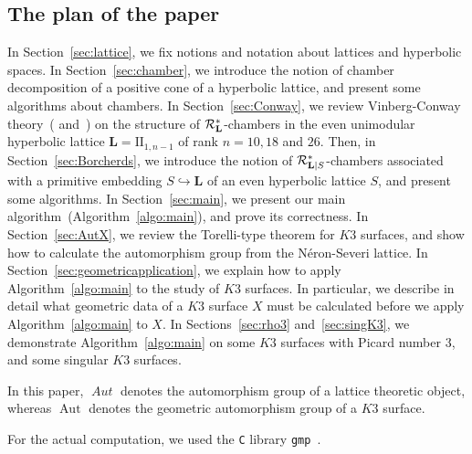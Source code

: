 \documentclass{amsart}
\theoremstyle{plain}
\theoremstyle{definition}
\theoremstyle{remark}
\numberwithin{equation}{section}
\numberwithin{table}{section}
\numberwithin{figure}{section}
\newcommand{\RRR}{\mathord{\mathcal R}}
\newcommand{\inj}{\hookrightarrow}
\newcommand{\Aut}{\operatorname{\mathrm {Aut}}\nolimits}
\renewcommand{\L}{\mathord{\mathbf{L}}}
\newcommand{\aut}{\operatorname{\mathit {Aut}}\nolimits}
\newcommand{\Roots}{\RRR}
\newcommand{\sphyp}{\sp*}
\newcommand{\RtsLS}{\Roots_{\L|S}}
\begin{document}
\subsection{The plan of the paper}
%
In Section~\ref{sec:lattice},
we fix notions and notation about lattices
and hyperbolic spaces.
In Section~\ref{sec:chamber},
we introduce the notion of chamber decomposition of a positive cone
of a hyperbolic lattice,
and present some algorithms about chambers.
In Section~\ref{sec:Conway},
we review Vinberg-Conway theory~(\cite{MR0422505} and~\cite[Chapter 27]{MR1662447})
on the structure of $\Roots_{\L}\sphyp$-chambers in 
the even unimodular hyperbolic lattice $\L=\textrm{II}_{1, n-1}$  of rank $n=10, 18$ and  $26$. 
Then, in Section~\ref{sec:Borcherds},
we introduce the notion of $\RtsLS\sphyp$-chambers
associated with a primitive embedding $S\inj \L$ of an even hyperbolic lattice $S$,
and  present 
some algorithms.
In Section~\ref{sec:main},
we present our main algorithm~(Algorithm~\ref{algo:main}),
and prove its correctness.
In Section~\ref{sec:AutX}, 
we review the Torelli-type theorem for $K3$ surfaces,
and show how to calculate  the automorphism group  from the N\'eron-Severi lattice.
In Section~\ref{sec:geometricapplication},
we explain how to apply Algorithm~\ref{algo:main} to the study of 
$K3$ surfaces.
In particular, 
we describe in detail what geometric data of a $K3$ surface $X$
must be calculated before we apply Algorithm~\ref{algo:main} to $X$.
In Sections~\ref{sec:rho3} and~\ref{sec:singK3}, 
we demonstrate Algorithm~\ref{algo:main} on  some $K3$ surfaces
with Picard number $3$, and some singular $K3$ surfaces.
\par 
\medskip
In this paper, $\aut$ denotes the automorphism group of a lattice theoretic object,
whereas $\Aut$ denotes the geometric automorphism group of a $K3$ surface.
\par 
\medskip
For the actual computation,
we used the {\tt C} library  {\tt gmp}~\cite{gmp}.
%
%
\end{document}

